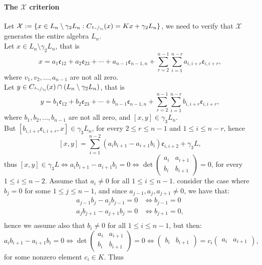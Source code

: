 \documentclass{article}
\newcommand{\e}{\mathfrak{e}}
\begin{document}
\paragraph{The $\mathcal{X}$ criterion}
\label{x-criterion}
Let $\mathcal{X}:=\{x\in{L}_n\setminus\gamma_2L_n : C_{\sfrac{L_n}{\gamma_3}}(x)=Kx+\gamma_2L_n\}$, we need to verify that $\mathcal{X}$ generates the entire algebra $L_n$.\\
Let $x\in{L}_n\setminus\gamma_2{L}_n$, that is\\  \[x=a_1\e_{12}+a_2\e_{23}+\cdots+a_{n-1}\e_{n-1,n}+\sum_{r=2}^{n-1}\sum_{i=1}^{n-r}a_{i,i+r}\e_{i,i+r},\] 
where $v_1,v_2,\dots,a_{n-1}$ are not all zero.\\
Let $y\in{C}_{\sfrac{L_n}{\gamma_3}}(x)\cap\left(L_n\setminus\gamma_2L_n\right)$, that is 
\[y=b_1\e_{12}+b_2\e_{23}+\cdots+b_{n-1}\e_{n-1,n}+\sum_{r=2}^{n-1}\sum_{i=1}^{n-r}b_{i,i+r}\e_{i,i+r},\] 
where $b_1,b_2,\dots,b_{n-1}$ are not all zero, and $[x,y]\in\gamma_3L_n$.\\
But $[b_{i,i+r}\e_{i,i+r},x]\in\gamma_3L_n$, for every $2\leq{r}\leq{n-1}$ and $1\leq{i}\leq{n-r}$, hence
\[
[x,y]=\sum_{i=1}^{n-2}\left(a_ib_{i+1}-a_{i+1}b_i\right)\e_{i,i+2}+\gamma_3L
,\]
thus $[x,y]\in\gamma_3L\iff{a}_ib_{i+1}-a_{i+1}b_i=0\iff\det\begin{pmatrix}
a_i&a_{i+1}\\
b_i&b_{i+1}
\end{pmatrix}=0$, 
for every $1\leq{i}\leq{n-2}$.
Assume that $a_i\neq{0}$ for all $1\leq{i}\leq{n-1}$.
consider the case where $b_j=0$ for some $1\leq{j}\leq{n-1}$, and since $a_{j-1},a_j,a_{j+1}\neq{0}$, we have that:
\begin{align*}
a_{j-1}b_j-a_jb_{j-1}=0&\iff{b}_{j-1}=0\\ 
a_{j}b_{j+1}-a_{j+1}b_j=0&\iff{b}_{j+1}=0,\\
\end{align*}
hence we assume also that $b_i\neq{0}$ for all $1\leq{i}\leq{n-1}$, but then:
\[a_{i}b_{i+1}-a_{i+1}b_i=0\iff\det\begin{pmatrix}
a_i&a_{i+1}\\
b_i&b_{i+1}
\end{pmatrix}=0\iff\begin{pmatrix}
    b_i&b_{i+1}
\end{pmatrix}=c_i\begin{pmatrix}
    a_i&a_{i+1}
\end{pmatrix},\]
for some nonzero element $c_i\in{K}$. Thus\\ 
\end{document}
